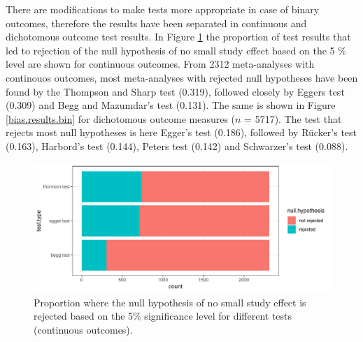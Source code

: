 \documentclass[11pt,a4paper,twoside]{book}\usepackage[]{graphicx}\usepackage[]{color}
\newenvironment{knitrout}{}{} %
\begin{document}
\vspace{0mm}
There are modifications to make tests more appropriate in case of binary outcomes, therefore the results have been separated in continuous and dichotomous outcome test results. In Figure \ref{bias.results.cont} the proportion of test results that led to rejection of the null hypothesis of no small study effect based on the 5 \% level are shown for continuous outcomes. From 2312 meta-analyses with continouos outcomes, most meta-analyses with rejected null hypotheses have been found by the Thompson and Sharp test (0.319), followed closely by Eggers test (0.309) and Begg and Mazumdar's test (0.131).
The same is shown in Figure \ref{bias.results.bin} for dichotomous outcome measures ($n$ = 5717). The test that rejects most null hypotheses is here Egger's test (0.186), followed by R\"ucker's test (0.163), Harbord's test (0.144), Peters test (0.142) and Schwarzer's test (0.088). 


\begin{figure}
\begin{knitrout}
\color{fgcolor}

{\centering \includegraphics[width=\textwidth-3cm]{figure/ch02_figunnamed-chunk-19-1} 

}



\end{knitrout}
\caption{Proportion where the null hypothesis of no small study effect is rejected based on the 5\% significance level for different tests (continuous outcomes).}
\label{bias.results.cont}
\end{figure}
\end{document}
